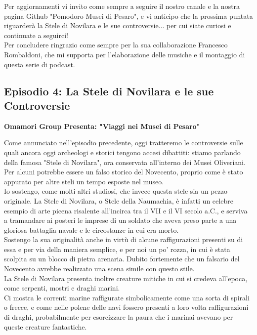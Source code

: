 \documentclass[hidelinks,12pt,a4paper]{article}
\begin{document}
\begin{flushleft}
		Per aggiornamenti vi invito come sempre a seguire il nostro canale e la nostra pagina Github "Pomodoro Musei di Pesaro", e vi anticipo che la prossima puntata riguarderà la Stele di Novilara e le sue controversie... per cui siate curiosi e continuate a seguirci!\\
		Per concludere ringrazio come sempre per la sua collaborazione Francesco Rombaldoni, che mi supporta per l'elaborazione delle musiche e il montaggio di questa serie di podcast.\\
		
		\subsection{Episodio 4: La Stele di Novilara e le sue Controversie}
		\begin{center}
			\textbf{Omamori Group Presenta: "Viaggi nei Musei di Pesaro"}
		\end{center}
		Come annunciato nell'episodio precedente, oggi tratteremo le controversie sulle quali ancora oggi archeologi e storici tengono accesi dibattiti: stiamo parlando della famosa "Stele di Novilara", ora conservata all'interno dei Musei Oliveriani. Per alcuni potrebbe essere un falso storico del Novecento, proprio come è stato appurato per altre steli un tempo esposte nel museo.\\
		Io sostengo, come molti altri studiosi, che invece questa stele sia un pezzo originale. La Stele di Novilara, o Stele della Naumachia, è infatti un celebre esempio di arte picena risalente all'incirca tra il VII e il VI secolo a.C., e serviva a tramandare ai posteri le imprese di un soldato che aveva preso parte a una gloriosa battaglia navale e le circostanze in cui era morto.\\
		Sostengo la sua originalità anche in virtù di alcune raffigurazioni presenti su di essa e per via della maniera semplice, e per noi un po' rozza, in cui è stata scolpita su un blocco di pietra arenaria. Dubito fortemente che un falsario del Novecento avrebbe realizzato una scena simile con questo stile.\\
		La Stele di Novilara presenta inoltre creature mitiche in cui si credeva all'epoca, come serpenti, mostri e draghi marini.\\
		Ci mostra le correnti marine raffigurate simbolicamente come una sorta di spirali o frecce, e come nelle polene delle navi fossero presenti a loro volta raffigurazioni di draghi, probabilmente per esorcizzare la paura che i marinai avevano per queste creature fantastiche.\\

\end{flushleft}
\end{document}
